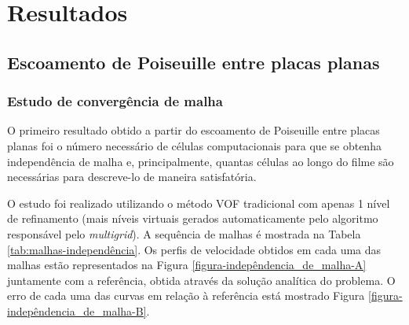 \chapter{Resultados}

\section{Escoamento de Poiseuille entre placas planas}

\subsection{Estudo de convergência de malha}

O primeiro resultado obtido a partir do escoamento de Poiseuille entre placas planas foi o número necessário de células computacionais para que se obtenha independência de malha e, principalmente, quantas células ao longo do filme são necessárias para descreve-lo de maneira satisfatória.

O estudo foi realizado utilizando o método VOF tradicional com apenas 1 nível de refinamento (mais níveis virtuais gerados automaticamente pelo algoritmo responsável pelo \textit{multigrid}). A sequência de malhas é mostrada na Tabela \ref{tab:malhas-independência}. Os perfis de velocidade obtidos em cada uma das malhas estão representados na Figura \ref{figura-indepêndencia_de_malha-A} juntamente com a referência, obtida através da solução analítica do problema. O erro de cada uma das curvas em relação à referência está mostrado Figura \ref{figura-indepêndencia_de_malha-B}.

